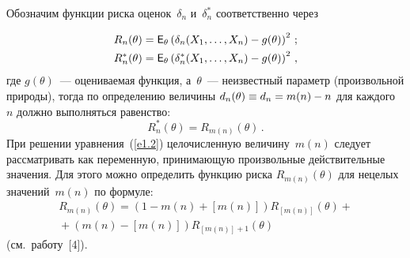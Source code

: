 \begin{multicols}{2}
Обозначим функции риска оценок~$\delta_n$ и~$\delta^*_n$ соответственно через

\noindent
\begin{align*}
R_n(\theta)& = {\sf E}_\theta \left(\delta_n(X_1,\ldots,X_n) 
- g(\theta)\right)^2\,;\\
R^*_n(\theta) & = {\sf E}_\theta \left(\delta^*_n(X_1,\ldots,X_n)
 - g(\theta)\right)^2\,,
\end{align*}
где $g(\theta)$~--- оцениваемая функция, а~$\theta$~--- 
неизвестный параметр (произвольной природы), тогда по определению 
величины $d_n(\theta)\hm \equiv d_n\hm = m(n)\hm - n$ 
для каждого~$n$ должно выполняться равенство:
\begin{equation}
R^*_n(\theta) = R_{m(n)}(\theta)\,. 
\label{e1.2}
\end{equation}
При решении уравнения~(\ref{e1.2}) целочисленную величину~$m(n)$ 
следует рассматривать как переменную, принимающую произвольные действительные значения. 
Для этого можно определить функцию риска $R_{m(n)}(\theta)$ для нецелых значений~$m(n)$ 
по формуле:
\begin{multline*}
R_{m(n)}(\theta) = \left(1 - m(n) + [m(n)]\right) R_{[m(n)]}(\theta) +{}\\
{}+
\left(m(n) - [m(n)]\right) R_{[m(n)]+1}(\theta)
\end{multline*}
(см.\ работу~[4]).


\end{multicols}
